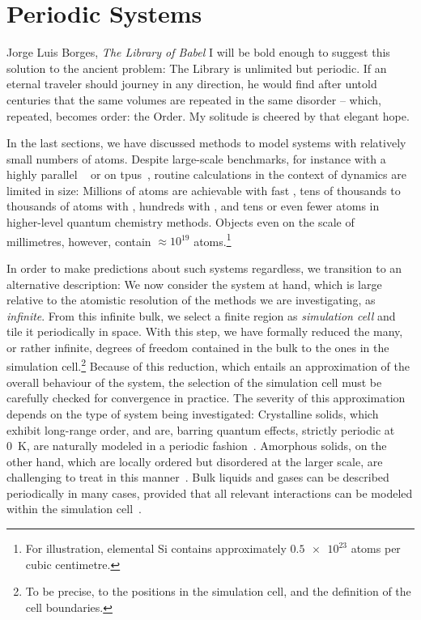 
\chapter{Periodic Systems}
\label{ch:pbc}

\begin{chapquote}{Jorge Luis Borges, \textit{The Library of Babel}}
	I will be bold enough to suggest this solution to the ancient problem: The Library is unlimited but periodic. If an eternal traveler should journey in any direction, he would find after untold centuries that the same volumes are repeated in the same disorder -- which, repeated, becomes order: the Order. My solitude is cheered by that elegant hope.
\end{chapquote}


\noindent
In the last sections, we have discussed methods to model systems with relatively small numbers of atoms. 
Despite large-scale benchmarks, for instance with a highly parallel \mlp~\cite{jxvk2022a} or \dft on \glspl{tpu}~\cite{pkps2022a}, routine calculations in the context of dynamics are limited in size: Millions of atoms are achievable with fast \ffs, tens of thousands to thousands of atoms with \mlps, hundreds with \dft, and tens or even fewer atoms in higher-level quantum chemistry methods.
Objects even on the scale of millimetres, however, contain $\approx 10^{19}$ atoms.\footnote{For illustration, elemental Si contains approximately $\num{0.5e+23}$ atoms per cubic centimetre.}

In order to make predictions about such  systems regardless, we transition to an alternative description: We now consider the system at hand, which is large relative to the atomistic resolution of the methods we are investigating, as \emph{infinite}. From this infinite bulk, we select a finite region as \emph{simulation cell} and tile it periodically in space. With this step, we have formally reduced the many, or rather infinite, degrees of freedom contained in the bulk to the ones in the simulation cell.\footnote{To be precise, to the positions in the simulation cell, and the definition of the cell boundaries.} Because of this reduction, which entails an approximation of the overall behaviour of the system, the selection of the simulation cell must be carefully checked for convergence in practice. The severity of this approximation depends on the type of system being investigated: Crystalline solids, which exhibit long-range order, and are, barring quantum effects, strictly periodic at \qty{0}{K}, are naturally modeled in a periodic fashion~\cite{ashcroft1976}. Amorphous solids, on the other hand, which are locally ordered but disordered at the larger scale, are challenging to treat in this manner~\cite{dhc2022p}. Bulk liquids and gases can be described periodically in many cases, provided that all relevant interactions can be modeled within the simulation cell~\cite{tuckerman2010}.

